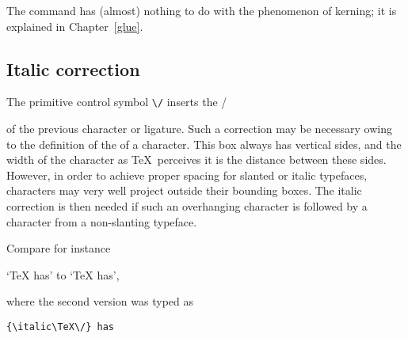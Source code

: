 \documentclass{book}
\begin{document}
The  command has (almost) nothing to do with the
phenomenon of kerning; it is explained in Chapter~\ref{glue}.

\subsection{Italic correction}

The primitive control symbol \verb-\/- inserts the
\cstoidx /\par
of the previous character or ligature.
Such a correction may be necessary owing to the definition
of the  of a character. This box always
has vertical sides, and the width of the character as \TeX\
perceives it is the distance between these sides.
However, in order to achieve proper spacing  for slanted or
italic typefaces, characters may very well project outside their
bounding boxes. The italic correction is then needed if
such an overhanging character is followed by a
character from a non-slanting typeface.

Compare for instance
\begin{Disp} `{\italic\TeX} has'
to `{\italic\TeX\/} has',
\end{Disp} where the second version was typed as
\begin{verbatim}
{\italic\TeX\/} has
\end{verbatim}
\end{document}
